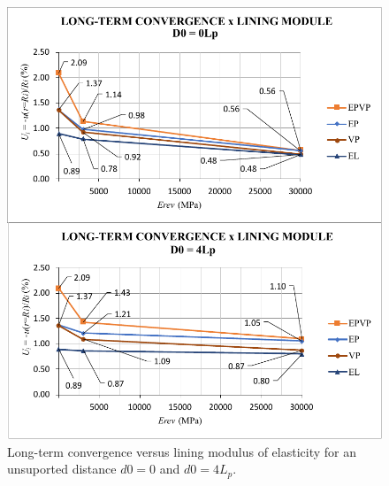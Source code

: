 \documentclass[Journal,letterpaper]{ascelike-new}
\begin{document}
\begin{figure}
	\centering
	\includegraphics[scale = 1.0]{convergence_lining_module.pdf}
	\caption{\label{convergence_lining_module}Long-term convergence versus lining modulus of elasticity for an unsuported distance $d0=0$ and $d0=4L_p$.}
\end{figure}


\end{document}
